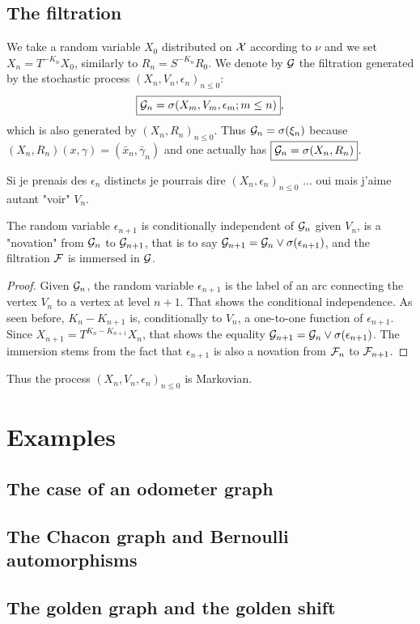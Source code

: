 \documentclass[12pt,a4paper]{article}
\begin{document}
\subsection{The filtration} 

We take a random variable $X_0$ distributed on $\mathcal{X}$ according to $\nu$ 
and we set $\boxed{X_n = T^{-K_n} X_0}$, similarly to $R_n = S^{-K_n} R_0$.
We denote by $\mathcal{G}$ the filtration generated by the stochastic process 
${(X_n, V_n, \epsilon_n)}_{n \leq 0}$:
$$
\boxed{\mathcal{G}_n = \sigma(X_m, V_m, \epsilon_m; m \leq n)}, 
$$
 which is also generated by ${(X_n, R_n)}_{n \leq 0}$. 
 Thus $\mathcal{G}_n = \sigma(\xi_n)$ because $(X_n,R_n)(x,\gamma) = (\bar x_n, \bar\gamma_n)$ 
and one actually has 
$\boxed{\mathcal{G}_n = \sigma(X_n, R_n)}$.

\begin{remark}
Si je prenais des $\epsilon_n$ distincts je pourrais dire 
${(X_n, \epsilon_n)}_{n \leq 0}$ ... oui mais j'aime autant "voir" $V_n$.
\end{remark}

\begin{lemma}
The random variable $\epsilon_{n+1}$ is conditionally independent of $\mathcal{G}_n$ 
given $V_n$, is 
a "novation" from $\mathcal{G}_n$ to $\mathcal{G}_{n+1}$, that is 
to say $\mathcal{G}_{n+1} = \mathcal{G}_n \vee \sigma(\epsilon_{n+1})$, and  
the filtration $\mathcal{F}$ is immersed in $\mathcal{G}$. 
\end{lemma}

\begin{proof}
Given $\mathcal{G}_n$, the random variable $\epsilon_{n+1}$ is the label of an 
arc connecting the vertex $V_n$ to a vertex at level $n+1$. 
That shows the conditional independence. 
As seen before, $K_{n}-K_{n+1}$ is, conditionally to $V_n$, 
a one-to-one function of $\epsilon_{n+1}$. Since 
$X_{n+1} = T^{K_{n}-K_{n+1}}X_n$, that shows the equality 
$\mathcal{G}_{n+1} = \mathcal{G}_n \vee \sigma(\epsilon_{n+1})$. 
The immersion stems from the fact that 
 $\epsilon_{n+1}$ is also a novation from $\mathcal{F}_n$ to $\mathcal{F}_{n+1}$.  
\end{proof}

Thus the process ${(X_n, V_n, \epsilon_n)}_{n \leq 0}$ is Markovian. 


\section{Examples}

\subsection{The case of an odometer graph}



\subsection{The Chacon graph and Bernoulli automorphisms}


\subsection{The golden graph and the golden shift}
\end{document}
